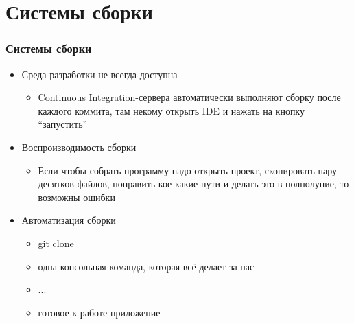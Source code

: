 \documentclass{../../slides-style}
\begin{document}
    \begin{frame}[plain]
        \titlepage
    \end{frame}

    \section{Системы сборки}

    \begin{frame}
        \frametitle{Системы сборки}
        \begin{itemize}
            \item Среда разработки не всегда доступна
            \begin{itemize}
                \item Continuous Integration-сервера автоматически выполняют сборку после каждого коммита, там некому открыть IDE и нажать на кнопку \enquote{запустить}
            \end{itemize}
            \item Воспроизводимость сборки
            \begin{itemize}
                \item Если чтобы собрать программу надо открыть проект, скопировать пару десятков файлов, поправить кое-какие пути и делать это в полнолуние, то возможны ошибки
            \end{itemize}
            \item Автоматизация сборки
            \begin{itemize}
                \item git clone
                \item одна консольная команда, которая всё делает за нас
                \item ...
                \item готовое к работе приложение
            \end{itemize}
        \end{itemize}
    \end{frame}
\end{document}
